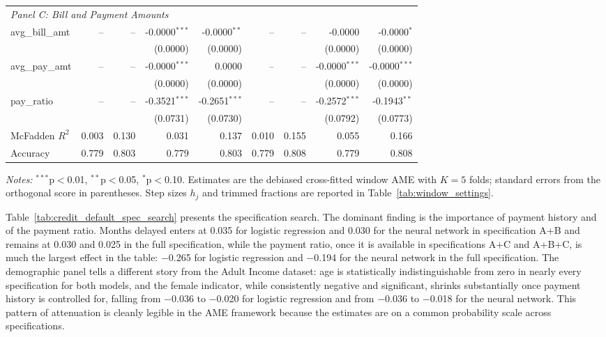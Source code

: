 \documentclass[12pt]{article}
\begin{document}
\begin{table}[htbp]
{\begin{threeparttable}
\begin{tabular}{lrrrrrrrr}
					\midrule
					\multicolumn{9}{l}{\textit{Panel C: Bill and Payment Amounts}} \\
					\quad avg\_bill\_amt & -- & -- & -0.0000$^{***}$ & -0.0000$^{**}$ & -- & -- & -0.0000 & -0.0000$^{*}$ \\
					&  &  & (0.0000) & (0.0000) &  &  & (0.0000) & (0.0000) \\
					\quad avg\_pay\_amt & -- & -- & -0.0000$^{***}$ & 0.0000 & -- & -- & -0.0000$^{***}$ & -0.0000$^{***}$ \\
					&  &  & (0.0000) & (0.0000) &  &  & (0.0000) & (0.0000) \\
					\quad pay\_ratio & -- & -- & -0.3521$^{***}$ & -0.2651$^{***}$ & -- & -- & -0.2572$^{***}$ & -0.1943$^{**}$ \\
					&  &  & (0.0731) & (0.0730) &  &  & (0.0792) & (0.0773) \\
					\midrule
					McFadden $R^2$ & 0.003 & 0.130 & 0.031 & 0.137 & 0.010 & 0.155 & 0.055 & 0.166 \\
					Accuracy & 0.779 & 0.803 & 0.779 & 0.803 & 0.779 & 0.808 & 0.779 & 0.808 \\
					\bottomrule
					\end{tabular}
					\begin{tablenotes}
					\footnotesize
					\item \textit{Notes:} $^{***}$p$<$0.01, $^{**}$p$<$0.05, $^{*}$p$<$0.10. Estimates are the debiased cross-fitted window AME with $K=5$ folds; standard errors from the orthogonal score in parentheses. Step sizes $h_j$ and trimmed fractions are reported in Table~\ref{tab:window_settings}.
					\end{tablenotes}
			\end{threeparttable}
		}%
	\end{table}
	
	Table~\ref{tab:credit_default_spec_search} presents the specification search. The dominant finding is the importance of payment history and of the payment ratio. Months delayed enters at 0.035 for logistic regression and 0.030 for the neural network in specification A+B and remains at 0.030 and 0.025 in the full specification, while the payment ratio, once it is available in specifications A+C and A+B+C, is much the largest effect in the table: $-$0.265 for logistic regression and $-$0.194 for the neural network in the full specification. The demographic panel tells a different story from the Adult Income dataset: age is statistically indistinguishable from zero in nearly every specification for both models, and the female indicator, while consistently negative and significant, shrinks substantially once payment history is controlled for, falling from $-$0.036 to $-$0.020 for logistic regression and from $-$0.036 to $-$0.018 for the neural network. This pattern of attenuation is cleanly legible in the AME framework because the estimates are on a common probability scale across specifications.
\end{document}
